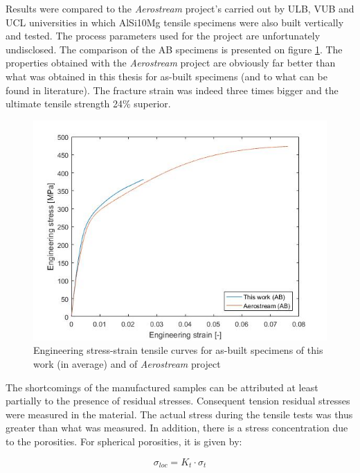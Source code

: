 Results were compared to the \textit{Aerostream} project's carried out by ULB, VUB and UCL universities in which AlSi10Mg tensile specimens were also built vertically and tested. The process parameters used for the project are unfortunately undisclosed. The comparison of the AB specimens is presented on figure \ref{fig:AerAB}. The properties obtained with the \textit{Aerostream} project are obviously far better than what was obtained in this thesis for as-built specimens (and to what can be found in literature). The fracture strain was indeed three times bigger and the ultimate tensile strength 24\% superior. \\

\begin{figure}[ht]
	\centering
	\centerline{\includegraphics[scale=0.64]{Images/AerAB}}
	\decoRule
	\caption[Engineering stress-strain tensile curves for as-built specimens of this work (in average) and of \textit{Aerostream} project]{Engineering stress-strain tensile curves for as-built specimens of this work (in average) and of \textit{Aerostream} project}
	\label{fig:AerAB}
\end{figure}

The shortcomings of the manufactured samples can be attributed at least partially to the presence of residual stresses. Consequent tension residual stresses were measured in the material. The actual stress during the tensile tests was thus greater than what was measured. In addition, there is a stress concentration due to the porosities. For spherical porosities, it is given by:

$$\sigma_{loc}=K_t \cdot \sigma_{t} $$

